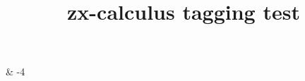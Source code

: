 \documentclass{article}
\title{zx-calculus tagging test}
\begin{document}
\begin{ZX}
\zxZ{\alpha} \arrow[r] & \zxFracX-{\pi}{4}
\end{ZX}
\end{document}
